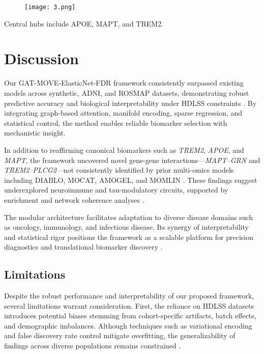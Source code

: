 \documentclass[12pt]{article}
\begin{document}
\begin{figure}[H]
\centering
\texttt{[image: 3.png]}
\label{fig:rosmap_gene_map}
\end{figure}
Central hubs include APOE, MAPT, and TREM2.
\section{Discussion}
Our GAT-MOVE-ElasticNet-FDR framework consistently surpassed existing models across synthetic, ADNI, and ROSMAP datasets, demonstrating robust predictive accuracy and biological interpretability under HDLSS constraints \citep{fan2008sure, lecun2015deep}. By integrating graph-based attention, manifold encoding, sparse regression, and statistical control, the method enables reliable biomarker selection with mechanistic insight.

In addition to reaffirming canonical biomarkers such as \textit{TREM2}, \textit{APOE}, and \textit{MAPT}, the framework uncovered novel gene-gene interactions—\textit{MAPT–GRN} and \textit{TREM2–PLCG2}—not consistently identified by prior multi-omics models including DIABLO, MOCAT, AMOGEL, and MOMLIN \citep{singh2019diablo, chen2021mocat, tan2025amogel, rashid2024momlin}. These findings suggest underexplored neuroimmune and tau-modulatory circuits, supported by enrichment and network coherence analyses \citep{raj2012network, de2019integrative}.

The modular architecture facilitates adaptation to diverse disease domains such as oncology, immunology, and infectious disease. Its synergy of interpretability and statistical rigor positions the framework as a scalable platform for precision diagnostics and translational biomarker discovery \citep{cardillo2025advancements}.

\subsection*{Limitations}

Despite the robust performance and interpretability of our proposed framework, several limitations warrant consideration. First, the reliance on HDLSS datasets introduces potential biases stemming from cohort-specific artifacts, batch effects, and demographic imbalances. Although techniques such as variational encoding and false discovery rate control mitigate overfitting, the generalizability of findings across diverse populations remains constrained \citep{lee2021bias, johnson2007adjusting}.
\end{document}
